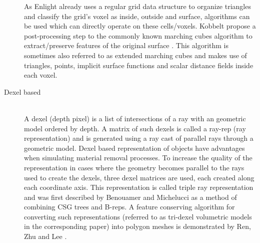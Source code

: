 \begin{description}
As Enlight already uses a regular grid data structure to organize triangles and classify the grid's voxel as inside, outside and surface, algorithms can be used which can directly operate on these cells/voxels.
Kobbelt \etal propose a post-processing step to the commonly known marching cubes algorithm to extract/preserve features of the original surface \cite{extended_marching_cubes}. This algorithm is sometimes also referred to as extended marching cubes and makes use of triangles, points, implicit surface functions and scalar distance fields inside each voxel.


\item[Dexel based] \hfill \\

A dexel (depth pixel) is a list of intersections of a ray with an geometric model ordered by depth. A matrix of such dexels is called a ray-rep (ray representation) and is generated using a ray cast of parallel rays through a geometric model. Dexel based representation of objects have advantages when simulating material removal processes. To increase the quality of the representation in cases where the geometry becomes parallel to the rays used to create the dexels, three dexel matrices are used, each created along each coordinate axis. This representation is called triple ray representation and was first described by Benouamer and Michelucci \cite{tridexel_intersection} as a method of combining CSG trees and B-reps. A feature conserving algorithm for converting such representations (referred to as tri-dexel volumetric models in the corresponding paper) into polygon meshes is demonstrated by Ren, Zhu and Lee \cite{tridexel_reconstruction}.

\end{description}
